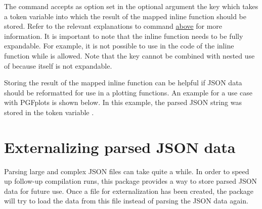 \documentclass[a4paper]{article}
\begin{document}
{{The command \macro{\JSONParseArrayMapInline} accepts as option set in the optional argument the key  which takes a token variable into which the result of the mapped inline function should be stored. Refer to the relevant explanations to command \macro{\JSONParseArrayUse} \hyperlink{macro:arrayuse}{above} for more information. It is important to note that the inline function needs to be fully expandable. For example, it is not possible to use \macro{\JSONParseValue} in the code of the inline function while \macro{\JSONParseExpandableValue} is allowed. Note that the key  cannot be combined with nested use of \macro{\JSONParseArrayMapInline} because \macro{\JSONParseArrayMapInline} itself is not expandable.

Storing the result of the mapped inline function can be helpful if JSON data should be reformatted for use in a plotting functions. An example for a use case with PGFplots is shown below. In this example, the parsed JSON string  was stored in the token variable \macro{\myJSONplotdata}.

\pgfplotsset{width=5.25cm}

\begin{codeexamplecolumns}

\end{codeexamplecolumns}

\section{Externalizing parsed JSON data}\label{sec:externalizing}

Parsing large and complex JSON files can take quite a while. In order to speed up follow-up compilation runs, this package provides a way to store parsed JSON data for future use. Once a file for externalization has been created, the package will try to load the data from this file instead of parsing the JSON data again.

}}
\end{document}
